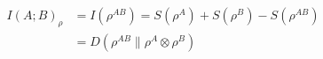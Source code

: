 \begin{align}
	I(A;B)_\rho &= I(\rho^{AB}) = S(\rho^A) + S(\rho^B) - S(\rho^{AB}) \\
	             &= D(\rho^{AB} \| \rho^A \otimes \rho^B)
\end{align}